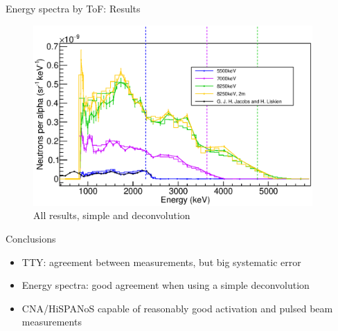 \documentclass[11pt]{beamer}
\begin{document}
\begin{frame}{Energy spectra by ToF: Results}
	\begin{figure}[H]
		\centering
		\includegraphics[width=0.95\textwidth]{pulsed_results.eps}
		\caption{All results, simple and deconvolution}
		\label{}
	\end{figure}
\end{frame}

\begin{frame}{Conclusions}
	\begin{itemize}
		\item TTY: agreement between measurements, but big systematic error
		\item Energy spectra: good agreement when using a simple deconvolution
		\item CNA/HiSPANoS capable of reasonably good activation and pulsed beam measurements
	\end{itemize}
\end{frame}
\end{document}
